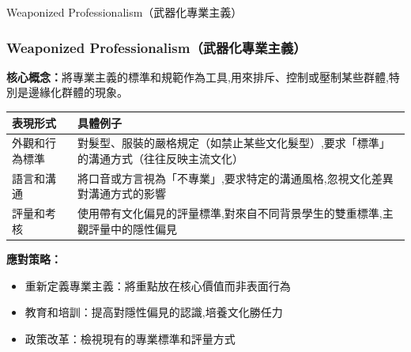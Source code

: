 \documentclass[aspectratio=169]{beamer}
\newcommand{\contentsize}{\fontsize{9pt}{11pt}\selectfont}
\newcommand{\tablesize}{\fontsize{7.5pt}{9pt}\selectfont}
\begin{document}
\begin{frame}{Weaponized Professionalism（武器化專業主義）}
\frametitle{Weaponized Professionalism（武器化專業主義）}
\contentsize

\textbf{核心概念：}將專業主義的標準和規範作為工具,用來排斥、控制或壓制某些群體,特別是邊緣化群體的現象。

\vspace{0.3cm}

\begin{table}[h]
\centering
\tablesize
\begin{tabular}{p{3.5cm}p{7.5cm}}
\toprule
\textbf{表現形式} & \textbf{具體例子} \\
\midrule
外觀和行為標準 & 對髮型、服裝的嚴格規定（如禁止某些文化髮型）,要求「標準」的溝通方式（往往反映主流文化） \\
\midrule
語言和溝通 & 將口音或方言視為「不專業」,要求特定的溝通風格,忽視文化差異對溝通方式的影響 \\
\midrule
評量和考核 & 使用帶有文化偏見的評量標準,對來自不同背景學生的雙重標準,主觀評量中的隱性偏見 \\
\bottomrule
\end{tabular}
\end{table}

\vspace{0.3cm}

\textbf{應對策略：}
\begin{itemize}
    \item \textcolor{ameered}{重新定義專業主義}：將重點放在核心價值而非表面行為
    \item \textcolor{ameered}{教育和培訓}：提高對隱性偏見的認識,培養文化勝任力
    \item \textcolor{ameered}{政策改革}：檢視現有的專業標準和評量方式
\end{itemize}
\end{frame}
\end{document}
